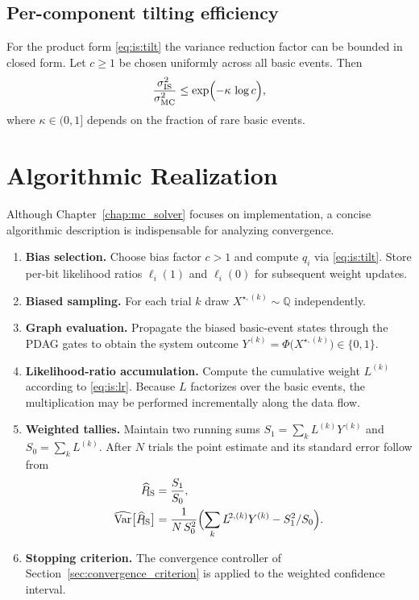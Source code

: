 \subsection{Per-component tilting efficiency}
For the product form \eqref{eq:is:tilt} the variance reduction factor can be
bounded in closed form.  Let \(c\ge1\) be chosen uniformly across all basic
events.  Then
\begin{equation}
  \frac{\sigma^{2}_{\text{IS}}}{\sigma^{2}_{\text{MC}}}
    \le \exp\Bigl(-\kappa\,\log c\Bigr),
\end{equation}
where \(\kappa\in(0,1]\) depends on the fraction of rare basic events.

\section{Algorithmic Realization}
\label{sec:is:algorithm}

Although Chapter~\ref{chap:mc_solver} focuses on implementation, a concise
algorithmic description is indispensable for analyzing
convergence.

\begin{enumerate}[label=\textbf{Step\,\arabic*},ref=Step~\arabic*]
  \item \textbf{Bias selection.}  Choose bias factor \(c>1\) and compute
        \(q_{i}\) via \eqref{eq:is:tilt}.  Store per-bit likelihood ratios
        \(\ell_{i}(1)\) and \(\ell_{i}(0)\) for subsequent weight updates.
  \item \textbf{Biased sampling.}  For each trial $k$ draw
        $X^{\star,(k)}\sim\mathbb{Q}$ independently.
  \item \textbf{Graph evaluation.}  Propagate the biased basic-event states
        through the PDAG gates to obtain the system outcome
        \(Y^{(k)}=\Phi\bigl(X^{\star,(k)}\bigr)\in\{0,1\}\).
  \item \textbf{Likelihood-ratio accumulation.}  Compute the cumulative weight
        $L^{(k)}$ according to \eqref{eq:is:lr}.  Because $L$ factorizes over
        the basic events, the multiplication may be performed
        incrementally along the data flow.
  \item \textbf{Weighted tallies.}  Maintain two running sums
        \(S_{1}=\sum_{k}L^{(k)}Y^{(k)}\) and
        \(S_{0}=\sum_{k}L^{(k)}\).  After \(N\) trials the point estimate and
        its standard error follow from
        \begin{align}
          \widehat{P}_{\!\text{IS}} &= \frac{S_{1}}{S_{0}}, \\
          \widehat{\operatorname{Var}}\bigl[\widehat{P}_{\!\text{IS}}\bigr]
             &= \frac{1}{N\,S_{0}^{2}}
                \Bigl(\sum_{k} L^{\!2,(k)} Y^{(k)} - S_{1}^{2}/S_{0}\Bigr).
        \end{align}
  \item \textbf{Stopping criterion.}  The convergence controller of
        Section~\ref{sec:convergence_criterion} is applied to the weighted
        confidence interval.
\end{enumerate}
